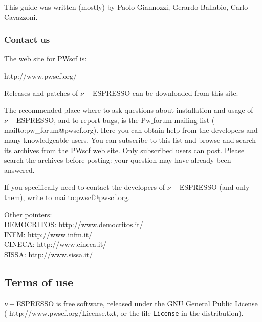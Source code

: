 \documentclass[12pt,a4paper]{article}
\begin{document}
This guide was written (mostly) by Paolo Giannozzi, Gerardo Ballabio,
Carlo Cavazzoni.

\subsubsection{Contact us}

The web site for PWscf is:
\medskip

%
                  {http://www.pwscf.org/}

\medskip
\noindent
Releases and patches of $\nu-$ESPRESSO can be downloaded from this
site.

The recommended place where to ask questions about installation and
usage of $\nu-$ESPRESSO, and to report bugs, is the Pw$\_$forum
mailing list
(%
                   {mailto:pw\_forum@pwscf.org}).
Here you can obtain help from the developers and many knowledgeable
users.  You can subscribe to this list and browse and search its
archives from the PWscf web site.  Only subscribed users can post.
Please search the archives before posting: your question may have
already been answered.

If you specifically need to contact the developers of $\nu-$ESPRESSO
(and only them), write to
%
                  {mailto:pwscf@pwscf.org}.

Other pointers:\\
DEMOCRITOS:
%
                  {http://www.democritos.it/}\\
INFM:
%
                  {http://www.infm.it/}\\
CINECA:
%
                  {http://www.cineca.it/}\\
SISSA:
%
                  {http://www.sissa.it/}

\subsection{Terms of use}

$\nu-$ESPRESSO is free software, released under the GNU General Public
License
(%
                   {http://www.pwscf.org/License.txt},
or the file \texttt{License} in the distribution).
\end{document}
